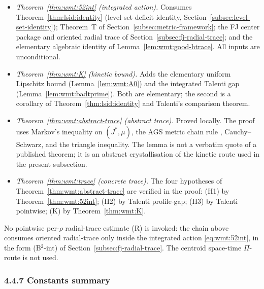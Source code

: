 \begin{itemize}
\item \emph{Theorem~\ref{thm:wmt:52int} (integrated action).} Consumes
   Theorem~\ref{thm:lsid:identity} (level-set deficit identity,
   Section~\ref{subsec:level-set-identity}); Theorem~T of
   Section~\ref{subsec:metric-framework}; the FJ center package and
   oriented radial trace of Section~\ref{subsec:fj-radial-trace}; and
   the elementary algebraic identity of
   Lemma~\ref{lem:wmt:good-htrace}. All inputs are unconditional.
\item \emph{Theorem~\ref{thm:wmt:K} (kinetic bound).} Adds the
   elementary uniform Lipschitz bound (Lemma~\ref{lem:wmt:A0}) and the
   integrated Talenti gap (Lemma~\ref{lem:wmt:badtprime}). Both are
   elementary; the second is a corollary of
   Theorem~\ref{thm:lsid:identity} and Talenti's comparison theorem.
\item \emph{Theorem~\ref{thm:wmt:abstract-trace} (abstract trace).}
   Proved locally. The proof uses Markov's inequality on
   $(J^*,\mu)$, the AGS metric chain rule
   \cite[Thm.~1.1.2]{AGS2008}, Cauchy--Schwarz, and the triangle
   inequality. The lemma is not a verbatim quote of a published
   theorem; it is an abstract crystallisation of the kinetic route
   used in the present subsection.
\item \emph{Theorem~\ref{thm:wmt:trace} (concrete trace).} The
   four hypotheses of Theorem~\ref{thm:wmt:abstract-trace} are verified
   in the proof: (H1) by Theorem~\ref{thm:wmt:52int}; (H2) by Talenti
   profile-gap; (H3) by Talenti pointwise; (K) by
   Theorem~\ref{thm:wmt:K}.
\end{itemize}

No pointwise per-$\rho$ radial-trace estimate (R) is invoked: the chain
above consumes oriented radial-trace only inside the integrated action
\eqref{eq:wmt:52int}, in the form (B$^2$-int) of
Section~\ref{subsec:fj-radial-trace}. The centroid space-time
$\Pi$-route is not used.

\subsubsection{4.4.7 Constants summary}
\label{subsec:wmt:constants}

